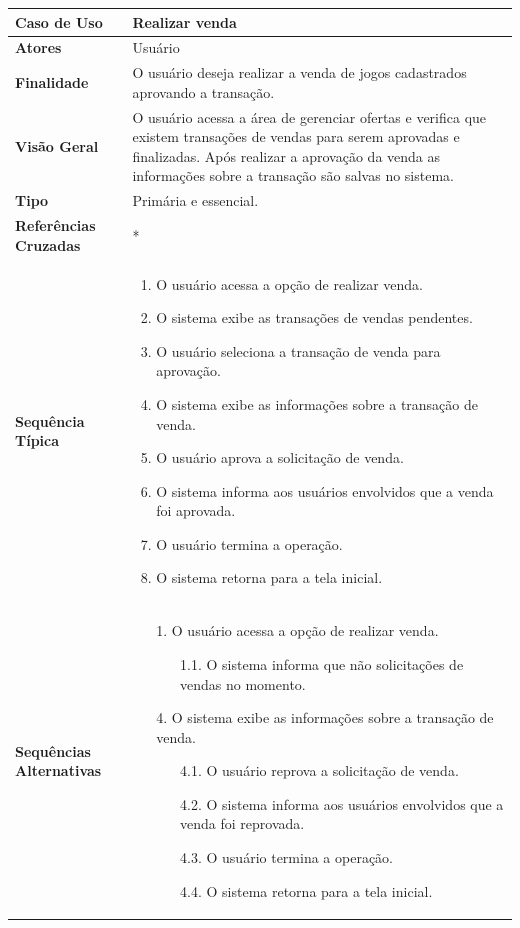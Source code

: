\documentclass[a4paper,11pt]{article}
\begin{document}
\begin{table}[H]
		\begin{tabularx}{\textwidth}{|l|X|}
		\hline
			\textbf{Caso de Uso} &  Realizar venda \\ \hline
			\textbf{Atores} &  Usuário  \\ \hline
			\textbf{Finalidade} & O usuário deseja realizar a venda de jogos cadastrados aprovando a transação.   \\ \hline
			\textbf{Visão Geral} & O usuário acessa a área de gerenciar ofertas e verifica que existem transações de vendas para serem aprovadas e finalizadas. Após realizar a aprovação da venda as informações sobre a transação são salvas no sistema.  \\ \hline
			\textbf{Tipo} & Primária e essencial. \\ \hline
			\textbf{Referências Cruzadas} & * \\ \hline
			\textbf{Sequência Típica} & 
			\begin{enumerate}
			\item O usuário acessa a opção de realizar venda.
			\item O sistema exibe as transações de vendas pendentes.
			\item O usuário seleciona a transação de venda para aprovação.
			\item O sistema exibe as informações sobre a transação de venda.
			\item O usuário aprova a solicitação de venda.
			\item O sistema informa aos usuários envolvidos que a venda foi aprovada.
			\item O usuário termina a operação.
			\item O sistema retorna para a tela inicial.
			 
			\end{enumerate} \\ \hline
			
			\textbf{Sequências Alternativas} & 
			\begin{itemize}
				\item[1.] O usuário acessa a opção de realizar venda.			
				\begin{itemize}
					\item[1.1.] O sistema informa que não solicitações de vendas no momento.
				\end{itemize}				
				
				\item[4.] O sistema exibe as informações sobre a transação de venda.
				\begin{itemize}
					\item[4.1.] O usuário reprova a solicitação de venda.
					\item[4.2.] O sistema informa aos usuários envolvidos que a venda foi reprovada.	
					\item[4.3.] O usuário termina a operação.
					\item[4.4.] O sistema retorna para a tela inicial.
				\end{itemize}
			\end{itemize} \\ \hline
		\end{tabularx}
\end{table}
\end{document}
